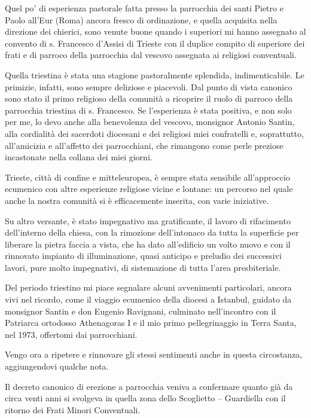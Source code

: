 \begin{italico}
\noindent\flqq Quel po' di esperienza pastorale fatta presso la parrocchia dei santi Pietro e Paolo all’Eur (Roma) ancora fresco di ordinazione, e quella acquisita nella direzione dei chierici, sono venute buone quando i superiori mi hanno assegnato al convento di s. Francesco d’Assisi di Trieste con il duplice compito di superiore dei frati e di parroco della parrocchia dal vescovo assegnata ai religiosi conventuali.

Quella triestina è stata una stagione pastoralmente splendida, indimenticabile. Le primizie, infatti, sono sempre deliziose e piacevoli. Dal punto di vista canonico sono stato il primo religioso della comunità a ricoprire il ruolo di parroco della parrocchia triestina di s. Francesco. Se l’esperienza è stata positiva, e non solo per me, lo devo anche alla benevolenza del vescovo, monsignor Antonio Santin, alla cordialità dei sacerdoti diocesani e dei religiosi miei confratelli e, soprattutto, all’amicizia e all’affetto dei parrocchiani, che rimangono come perle preziose incastonate nella collana dei miei giorni. 

Trieste, città di confine e mitteleuropea, è sempre stata sensibile all’approccio ecumenico con altre esperienze religiose vicine e lontane: un percorso nel quale anche la nostra comunità si è efficacemente inserita, con varie iniziative.

Su altro versante, è stato impegnativo ma gratificante, il lavoro di rifacimento dell’interno della chiesa, con la rimozione dell’intonaco da tutta la superficie per liberare la pietra faccia a vista, che ha dato all’edificio un volto nuovo e con il rinnovato impianto di illuminazione, quasi anticipo e preludio dei successivi lavori, pure molto impegnativi, di sistemazione di tutta l’area presbiteriale. 

Del periodo triestino mi piace segnalare alcuni avvenimenti particolari, ancora vivi nel ricordo, come il viaggio ecumenico della diocesi a Istanbul, guidato da monsignor Santin e don Eugenio Ravignani, culminato nell’incontro con il Patriarca ortodosso Athenagoras I e il mio primo pellegrinaggio in Terra Santa, nel 1973, offertomi dai parrocchiani.\frqq
\end{italico}
\bigbreak

\noindent Vengo ora a ripetere e rinnovare gli stessi sentimenti anche in questa circostanza, aggiungendovi qualche nota. 

Il decreto canonico di erezione a parrocchia veniva a confermare quanto già da circa venti anni si svolgeva in quella zona dello Scoglietto – Guardiella con il ritorno dei Frati Minori Conventuali. 


